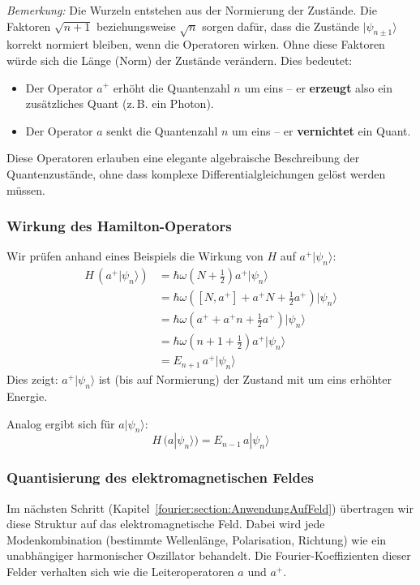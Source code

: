 			\textit{Bemerkung:} 
			Die Wurzeln entstehen aus der Normierung der Zustände.
			Die Faktoren $\sqrt{n+1}$ beziehungsweise $\sqrt{n}$ sorgen dafür, dass die Zustände $|\psi_{n\pm1}\rangle$ korrekt normiert bleiben, wenn die Operatoren wirken.
			Ohne diese Faktoren würde sich die Länge (Norm) der Zustände verändern.
			Dies bedeutet:
			\begin{itemize}
				\item Der Operator $a^+$ erhöht die Quantenzahl $n$ um eins – er \textbf{erzeugt} also ein zusätzliches Quant (z.\,B. ein Photon).
				\item Der Operator $a$ senkt die Quantenzahl $n$ um eins – er \textbf{vernichtet} ein Quant.
			\end{itemize}

			Diese Operatoren erlauben eine elegante algebraische Beschreibung der Quantenzustände, ohne dass komplexe Differentialgleichungen gelöst werden müssen.

		\subsubsection{Wirkung des Hamilton-Operators\label{fourier:subsubsection:WirkungHamiltonoperator}}
			Wir prüfen anhand eines Beispiels die Wirkung von \( H \) auf \( a^+|\psi_n\rangle \):
			\begin{align}
				H\, (a^+|\psi_n\rangle)
				&= \hbar\omega \left(N + \tfrac{1}{2}\right) a^+|\psi_n\rangle \\[0.5em]
				&= \hbar\omega \left([N, a^+] + a^+ N + \tfrac{1}{2} a^+\right)|\psi_n\rangle \\[0.5em]
				&= \hbar\omega \left(a^+ + a^+ n + \tfrac{1}{2} a^+\right)|\psi_n\rangle \\[0.5em]
				&= \hbar\omega \left(n + 1 + \tfrac{1}{2}\right) a^+|\psi_n\rangle \\[0.5em]
				&= E_{n+1}\, a^+|\psi_n\rangle
			\end{align}
			Dies zeigt:
			\( a^+|\psi_n\rangle \) ist (bis auf Normierung) der Zustand mit um eins erhöhter Energie.

			Analog ergibt sich für \( a|\psi_n\rangle \):
			\begin{equation}
				H\, (a|\psi_n\rangle) = E_{n-1}\, a|\psi_n\rangle
			\end{equation}

		\subsubsection{Quantisierung des elektromagnetischen Feldes\label{fourier:subsubsection:QuantisierungElmagFeld}}
			Im nächsten Schritt (Kapitel~\ref{fourier:section:AnwendungAufFeld}) übertragen wir diese Struktur auf das elektromagnetische Feld.
			Dabei wird jede Modenkombination (bestimmte Wellenlänge, Polarisation, Richtung) wie ein unabhängiger harmonischer Oszillator behandelt.
			Die Fourier-Koeffizienten dieser Felder verhalten sich wie die Leiteroperatoren $a$ und $a^+$.

